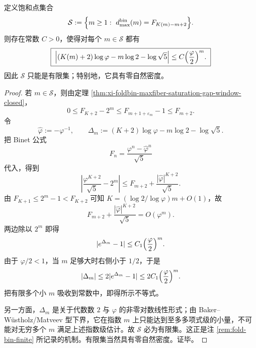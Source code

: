 \begin{theorem}\label{thm:xi-foldbin-saturation-diophantine-finiteness}
定义饱和点集合
\[
\mathcal S
:=
\Bigl\{
m\ge 1:\ d_{\max}^{\mathrm{bin}}(m)=F_{K(m)-m+2}
\Bigr\}.
\]
则存在常数 \(C>0\)，使得对每个 \(m\in\mathcal S\) 都有
\[
\boxed{\;
\Bigl|(K(m)+2)\log\varphi-m\log 2-\log\sqrt5\Bigr|
\le
C\Bigl(\frac{\varphi}{2}\Bigr)^m.
\;}
\]
因此 \(\mathcal S\) 只能是有限集；特别地，它具有零自然密度。
\end{theorem}
\begin{proof}
若 \(m\in\mathcal S\)，则由定理 \ref{thm:xi-foldbin-maxfiber-saturation-gap-window-closed}，
\[
0\le F_{K+2}-2^m\le F_{m+1+\varepsilon_m}-1\le F_{m+2}.
\]
令
\[
\widehat\varphi:=-\varphi^{-1},
\qquad
\Delta_m:=(K+2)\log\varphi-m\log 2-\log\sqrt5.
\]
把 Binet 公式
\[
F_n=\frac{\varphi^n-\widehat\varphi^n}{\sqrt5}
\]
代入，得到
\[
\left|
\frac{\varphi^{K+2}}{\sqrt5}-2^m
\right|
\le
F_{m+2}+\frac{|\widehat\varphi|^{K+2}}{\sqrt5}.
\]
由 \(F_{K+1}\le 2^m-1<F_{K+2}\) 可知 \(K=(\log 2/\log\varphi)m+O(1)\)，故
\[
F_{m+2}+\frac{|\widehat\varphi|^{K+2}}{\sqrt5}
=
O(\varphi^m).
\]
两边除以 \(2^m\) 即得
\[
|e^{\Delta_m}-1|
\le
C_1\Bigl(\frac{\varphi}{2}\Bigr)^m.
\]
由于 \(\varphi/2<1\)，当 \(m\) 足够大时右侧小于 \(1/2\)，于是
\[
|\Delta_m|
\le
2|e^{\Delta_m}-1|
\le
2C_1\Bigl(\frac{\varphi}{2}\Bigr)^m.
\]
把有限多个小 \(m\) 吸收到常数中，即得所示不等式。

另一方面，\(\Delta_m\) 是关于代数数 \(2\) 与 \(\varphi\) 的非零对数线性形式；由 Baker--W\"ustholz/Matveev 型下界，它在指数 \(m\) 上只能达到至多多项式级的小量，不可能对无穷多个 \(m\) 满足上述指数级估计。故 \(\mathcal S\) 必为有限集。这正是注 \ref{rem:fold-bin-finite} 所记录的机制。有限集当然具有零自然密度。证毕。
\end{proof}


